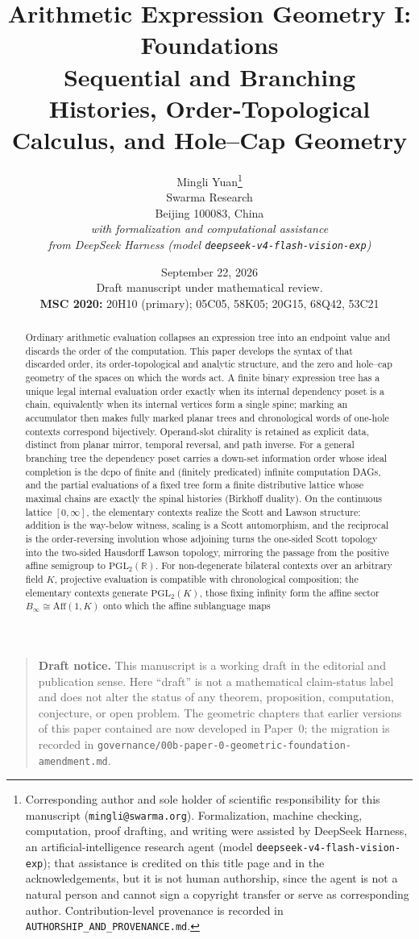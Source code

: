 \documentclass[11pt]{article}
\title{\textbf{Arithmetic Expression Geometry I: Foundations}\\[0.45em]
\large Sequential and Branching Histories, Order-Topological Calculus, and
Hole--Cap Geometry}
\author{
Mingli Yuan\thanks{Corresponding author and sole holder of scientific
responsibility for this manuscript
(\texttt{mingli@swarma.org}).  Formalization, machine checking, computation,
proof drafting, and writing were assisted by DeepSeek Harness, an
artificial-intelligence research agent (model
\texttt{deepseek-v4-flash-vision-exp}); that assistance is credited on this
title page and in the acknowledgements, but it is not human authorship, since
the agent is not a natural person and cannot sign a copyright transfer or serve
as corresponding author.  Contribution-level provenance is recorded in
\texttt{AUTHORSHIP\_AND\_PROVENANCE.md}.}\\
\small Swarma Research\\
\small Beijing 100083, China\\[0.5em]
\small\itshape with formalization and computational assistance\\
\small\itshape from DeepSeek Harness
(model \texttt{deepseek-v4-flash-vision-exp})
}
\date{September 22, 2026\\[0.25em]
\small Draft manuscript under mathematical review.\\[0.35em]
\small
\textbf{MSC 2020:} 20H10 (primary); 05C05, 58K05;
20G15, 68Q42, 53C21}
\theoremstyle{definition}
\theoremstyle{remark}
\begin{document}
\maketitle

\begin{quote}\small
\textbf{Draft notice.}
This manuscript is a working draft in the editorial and publication sense.
Here ``draft'' is not a mathematical claim-status label and does not alter the
status of any theorem, proposition, computation, conjecture, or open problem.
The geometric chapters that earlier versions of this paper contained are now
developed in Paper~0; the migration is recorded in
\texttt{governance/00b-paper-0-geometric-foundation-amendment.md}.
\end{quote}

\begin{abstract}
Ordinary arithmetic evaluation collapses an expression tree into an endpoint
value and discards the order of the computation.
This paper develops the syntax of that discarded order, its order-topological
and analytic structure, and the zero and hole--cap geometry of the spaces on
which the words act.
A finite binary expression tree has a unique legal internal evaluation order
exactly when its internal dependency poset is a chain, equivalently when its
internal vertices form a single spine; marking an accumulator then makes fully
marked planar trees and chronological words of one-hole contexts correspond
bijectively.  Operand-slot chirality is retained as explicit data, distinct
from planar mirror, temporal reversal, and path inverse.
For a general branching tree the dependency poset carries a down-set
information order whose ideal completion is the dcpo of finite and (finitely
predicated) infinite computation DAGs, and the partial evaluations of a fixed
tree form a finite distributive lattice whose maximal chains are exactly the
spinal histories (Birkhoff duality).
On the continuous lattice $[0,\infty]$, the elementary contexts realize the
Scott and Lawson structure: addition is the way-below witness, scaling is a
Scott automorphism, and the reciprocal is the order-reversing involution whose
adjoining turns the one-sided Scott topology into the two-sided Hausdorff Lawson
topology, mirroring the passage from the positive affine semigroup to
$\mathrm{PGL}_2(\mathbb R)$.
For non-degenerate bilateral contexts over an arbitrary field $K$, projective
evaluation is compatible with chronological composition; the elementary contexts
generate $\mathrm{PGL}_2(K)$, those fixing infinity form the affine sector
$B_\infty\cong\mathrm{Aff}(1,K)$ onto which the affine sublanguage maps

\end{abstract}
\end{document}
